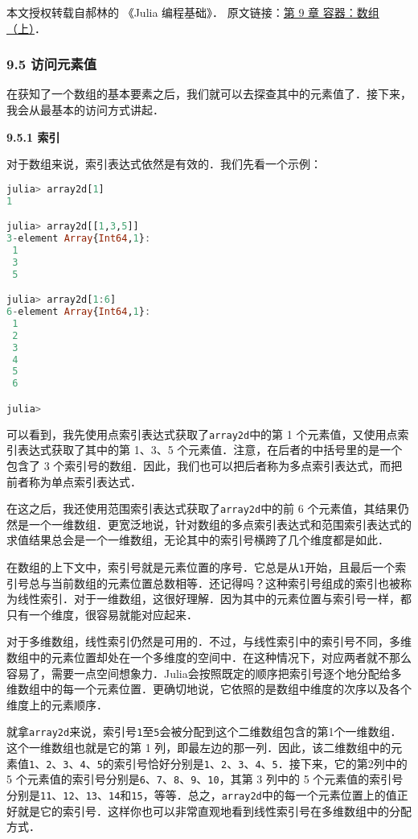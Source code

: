 
本文授权转载自郝林的 《Julia 编程基础》． 原文链接：\href{https://github.com/hyper0x/JuliaBasics/blob/master/book/ch09.md}{第 9 章 容器：数组（上）}．


\subsubsection{9.5 访问元素值}

在获知了一个数组的基本要素之后，我们就可以去探查其中的元素值了．接下来，我会从最基本的访问方式讲起．

\textbf{9.5.1 索引}

对于数组来说，索引表达式依然是有效的．我们先看一个示例：

\begin{lstlisting}[language=julia]
julia> array2d[1]
1

julia> array2d[[1,3,5]]
3-element Array{Int64,1}:
 1
 3
 5

julia> array2d[1:6]
6-element Array{Int64,1}:
 1
 2
 3
 4
 5
 6

julia> 
\end{lstlisting}

可以看到，我先使用点索引表达式获取了\verb|array2d|中的第 1 个元素值，又使用点索引表达式获取了其中的第 1、3、5 个元素值．注意，在后者的中括号里的是一个包含了 3 个索引号的数组．因此，我们也可以把后者称为多点索引表达式，而把前者称为单点索引表达式．

在这之后，我还使用范围索引表达式获取了\verb|array2d|中的前 6 个元素值，其结果仍然是一个一维数组．更宽泛地说，针对数组的多点索引表达式和范围索引表达式的求值结果总会是一个一维数组，无论其中的索引号横跨了几个维度都是如此．

在数组的上下文中，索引号就是元素位置的序号．它总是从\verb|1|开始，且最后一个索引号总与当前数组的元素位置总数相等．还记得吗？这种索引号组成的索引也被称为线性索引．对于一维数组，这很好理解．因为其中的元素位置与索引号一样，都只有一个维度，很容易就能对应起来．

对于多维数组，线性索引仍然是可用的．不过，与线性索引中的索引号不同，多维数组中的元素位置却处在一个多维度的空间中．在这种情况下，对应两者就不那么容易了，需要一点空间想象力．Julia会按照既定的顺序把索引号逐个地分配给多维数组中的每一个元素位置．更确切地说，它依照的是数组中维度的次序以及各个维度上的元素顺序．

就拿\verb|array2d|来说，索引号\verb|1|至\verb|5|会被分配到这个二维数组包含的第1个一维数组．这个一维数组也就是它的第 1 列，即最左边的那一列．因此，该二维数组中的元素值\verb|1|、\verb|2|、\verb|3|、\verb|4|、\verb|5|的索引号恰好分别是\verb|1|、\verb|2|、\verb|3|、\verb|4|、\verb|5|．接下来，它的第2列中的 5 个元素值的索引号分别是\verb|6|、\verb|7|、\verb|8|、\verb|9|、\verb|10|，其第 3 列中的 5 个元素值的索引号分别是\verb|11|、\verb|12|、\verb|13|、\verb|14|和\verb|15|，等等．总之，\verb|array2d|中的每一个元素位置上的值正好就是它的索引号．这样你也可以非常直观地看到线性索引号在多维数组中的分配方式．

